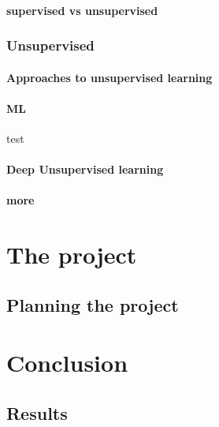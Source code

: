 \documentclass[a4paper,english]{ifimaster}
\begin{document}
		\subsection{supervised vs unsupervised}
			
	\section{Unsupervised}
		\subsection{Approaches to unsupervised learning}			
		\subsection{ML}
		\cite{Goodfellow-et-al-2016} test
		\subsection{Deep Unsupervised learning}
		\subsection{more}
		
\part{The project}

\chapter{Planning the project}

\part{Conclusion}

\chapter{Results}

\backmatter{}

\printbibliography
\end{document}
